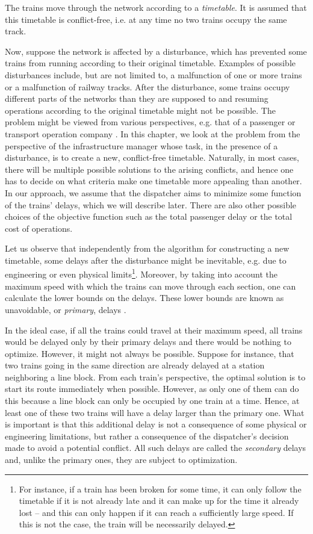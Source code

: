 The trains move through the network according to a \emph{timetable}. It is
assumed that this timetable is conflict-free, i.e. at any time no two trains
occupy the same track.

Now, suppose the network is affected by a disturbance, which has prevented some
trains from running according to their original timetable. Examples of possible
disturbances include, but are not limited to, a malfunction of one or more
trains or a malfunction of railway tracks. After the disturbance, some trains
occupy different parts of the networks than they are supposed to and resuming
operations according to the original timetable might not be possible. The problem
might be viewed from
various perspectives, e.g. that of a passenger or transport operation company
\cite{tornquist,lamorgese,Jensen2016}. In this chapter, we look at the problem
from the perspective of the infrastructure manager whose task, in the presence
of a disturbance, is to create a new, conflict-free timetable. Naturally, in
most cases, there will be multiple possible solutions to the arising conflicts,
and hence one has to decide on what criteria make one timetable more appealing
than another. In our approach, we assume that the dispatcher aims to minimize
some function of the trains' delays, which we will describe later. There are
also other possible choices of the objective function \cite{8795577} such as
the total passenger delay or the total cost of operations.

Let us observe that independently from the algorithm for constructing a new
timetable, some delays after the disturbance might be inevitable, e.g. due to
engineering or even physical limits\footnote{For instance, if a train has been broken
for some time, it can only follow the timetable if it is not already late and
it can make up for the time it already lost -- and this can only happen if it
can reach a sufficiently large speed. If this is not the case, the train will
be necessarily delayed.}. Moreover, by taking into account the maximum speed with
which the trains can move through each section, one can calculate the lower
bounds on the delays. These lower
bounds are known as unavoidable, or \emph{primary}, delays \cite{dariano}.

In the ideal case, if all the trains could travel at their maximum speed, all
trains would be delayed only by their primary delays and there would be nothing
to optimize. However, it might not always be possible. Suppose for instance,
that two trains going in the same direction are already delayed at a station
neighboring a line block. From each train's perspective, the optimal solution
is to start its route immediately when possible. However, as only one of them
can do this because a line block can only be occupied by one train at a time.
Hence, at least one of these two trains will have a delay larger than the
primary one. What is important is that this additional delay is not a
consequence of some physical or engineering limitations, but rather a
consequence of the dispatcher's decision made to avoid a potential conflict.
All such delays are called the \emph{secondary} delays and, unlike the primary
ones, they are subject to optimization.

